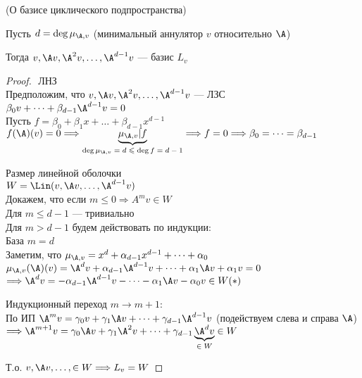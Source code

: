 \begin{theorem}(О базисе циклического подпространства)
    
    Пусть $d = \deg \mu_{\A, v}$ (минимальный аннулятор $v$ относительно $\A$)

    Тогда $v, \A v, \A^2 v, \dots, \A^{d - 1} v $ --- базис $L_v$

    \begin{proof}
    $ $ \newline
    \quad ЛНЗ \\
    Предположим, что $v, \A v, \A^2 v, \dots, \A^{d - 1} v $ --- ЛЗС \\
    $\beta_0 v + \dots + \beta_{d - 1} \A^{d - 1} v = 0$ \\
    Пусть $ f = \beta_0 + \beta_1 x + \dots + \beta_{d - 1} x^{d - 1} $ \\
    $ f(\A)(v) = 0 \Longrightarrow  \underbrace{\mu_{\A, v} | f}_{\text{$ \deg{ \mu_{\A, v}}= d \leqslant \deg{f} = d - 1 $}}  \Longrightarrow f = 0 \Longrightarrow \beta_0 = \dots = \beta_{d - 1}$

    \quad Размер линейной оболочки \\ 
    $ W = \Lin (v, \A v, \dots, \A^{d - 1} v) $ \\
    Докажем, что если $m \leqslant 0 \Longrightarrow A^m v \in W$ \\
    Для $ m \leqslant d - 1$ --- тривиально \\
    Для $m > d - 1$ будем действовать по индукции: \\
    \quad База $m = d$ \\
    Заметим, что $\mu_{\A, v} = x^d + \alpha_{d - 1} x^{d - 1} + \dots + \alpha_0$ \\
    $\mu_{\A, v}(\A)(v) = \A^dv + \alpha_{d - 1} \A^{d - 1}v + \dots + \alpha_1 \A v + \alpha_1 v = 0$ \\
    $\Longrightarrow \A^d v = - \alpha_{d - 1} \A^{d - 1}v - \dots - \alpha_1 \A v - \alpha_0 v \in W (*)$ 

    \quad Индукционный переход $m \to m + 1:$ \\
    По ИП $\A^m v = \gamma_0 v + \gamma_1 \A v + \dots + \gamma_{d - 1} \A^{d - 1} v$ (подействуем слева и справа $\A$)
    $\Longrightarrow \A^{m + 1} v = \gamma_0 \A v + \gamma_1 \A^2 v + \dots + \gamma_{d - 1} \underbrace{\A^{d} v}_{\text{$ \in W $}}  \in W$

    Т.о. $v, \A v, \dots, \in W \Longrightarrow L_v = W$
    \end{proof}
\end{theorem}

